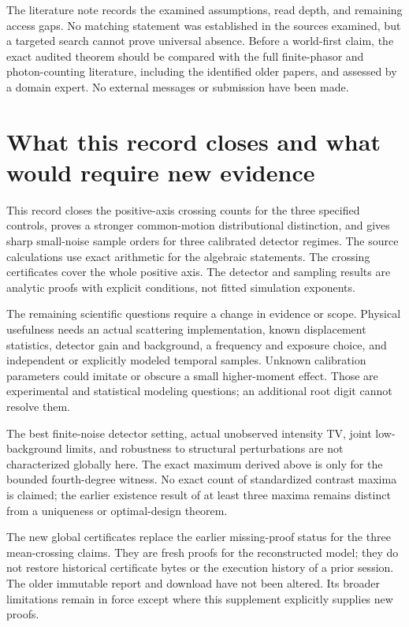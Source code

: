 \documentclass[11pt]{article}
\begin{document}
The literature note records the examined assumptions, read depth, and
remaining access gaps. No matching statement was established in the sources
examined, but a targeted search cannot prove universal absence. Before a
world-first claim, the exact audited theorem should be compared with the
full finite-phasor and photon-counting literature, including the identified
older papers, and assessed by a domain expert. No external messages or
submission have been made.

\section{What this record closes and what would require new evidence}

This record closes the positive-axis crossing counts for the three
specified controls, proves a stronger common-motion distributional
distinction, and gives sharp small-noise sample orders for three calibrated
detector regimes. The source calculations use exact arithmetic for the
algebraic statements. The crossing certificates cover the whole positive
axis. The detector and sampling results are analytic proofs with explicit
conditions, not fitted simulation exponents.

The remaining scientific questions require a change in evidence or scope.
Physical usefulness needs an actual scattering implementation, known
displacement statistics, detector gain and background, a frequency and
exposure choice, and independent or explicitly modeled temporal samples.
Unknown calibration parameters could imitate or obscure a small higher-moment
effect. Those are experimental and statistical modeling questions; an
additional root digit cannot resolve them.

The best finite-noise detector setting, actual unobserved intensity TV,
joint low-background limits, and robustness to structural perturbations
are not characterized globally here. The exact maximum derived above is
only for the bounded fourth-degree witness. No exact count of standardized
contrast maxima is claimed; the earlier existence result of at least three
maxima remains distinct from a uniqueness or optimal-design theorem.

The new global certificates replace the earlier missing-proof status for
the three mean-crossing claims. They are fresh proofs for the reconstructed
model; they do not restore historical certificate bytes or the execution
history of a prior session. The older immutable report and download have
not been altered. Its broader limitations remain in force except where
this supplement explicitly supplies new proofs.
\end{document}
